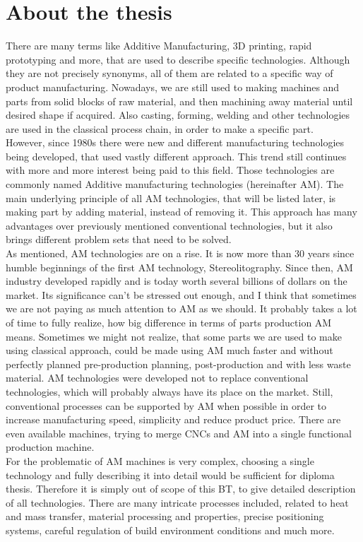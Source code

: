\documentclass[a4paper]{report}
\begin{document}
\section{About the thesis}
There are many terms like Additive Manufacturing, 3D printing, rapid prototyping and more, that are used to describe specific technologies. Although they are not precisely synonyms, all of them are related to a specific way of product manufacturing. Nowadays, we are still used to making machines and parts from solid blocks of raw material, and then machining away material until desired shape if acquired. Also casting, forming, welding and other technologies are used in the classical process chain, in order to make a specific part.\\
However, since 1980s there were new and different manufacturing technologies being developed, that used vastly different approach. This trend still continues with more and more interest being paid to this field. Those technologies are commonly named Additive manufacturing technologies (hereinafter AM). The main underlying principle of all AM technologies, that will be listed later, is making part by adding material, instead of removing it. This approach has many advantages over previously mentioned conventional technologies, but it also brings different problem sets that need to be solved.\\
As mentioned, AM technologies are on a rise. It is now more than 30 years since humble beginnings of the first AM technology, Stereolitography. Since then, AM industry developed rapidly and is today worth several billions of dollars on the market. Its significance can’t be stressed out enough, and I think that sometimes we are not paying as much attention to AM as we should. It probably takes a lot of time to fully realize, how big difference in terms of parts production AM means. Sometimes we might not realize, that some parts we are used to make using classical approach, could be made using AM much faster and without perfectly planned pre-production planning, post-production and with less waste material. AM technologies were developed not to replace conventional technologies, which will probably always have its place on the market. Still, conventional processes can be supported by AM when possible in order to increase manufacturing speed, simplicity and reduce product price. There are even available machines, trying to merge CNCs and AM into a single functional production machine.\\
For the problematic of AM machines is very complex, choosing a single technology and fully describing it into detail would be sufficient for diploma thesis. Therefore it is simply out of scope of this BT, to give detailed description of all technologies. There are many intricate processes included, related to heat and mass transfer, material processing and properties, precise positioning systems, careful regulation of build environment conditions and much more.\\
\end{document}
